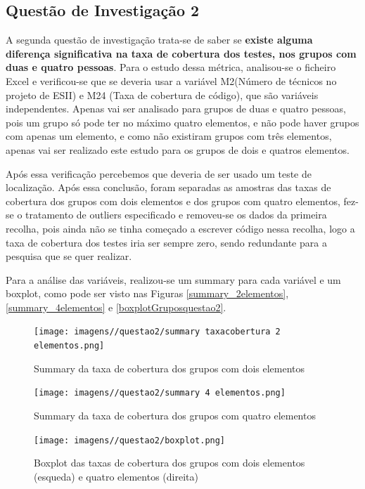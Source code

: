 \subsection{Questão de Investigação 2}
A segunda questão de investigação trata-se de saber se \textbf{existe alguma diferença significativa na taxa de cobertura dos testes, nos grupos com duas e quatro pessoas}. Para o estudo dessa métrica, analisou-se o ficheiro Excel e verificou-se que se deveria usar a variável M2(Número de técnicos no projeto de ESII) e M24 (Taxa de cobertura de código), que são variáveis independentes. Apenas vai ser analisado para grupos de duas e quatro pessoas, pois um grupo só pode ter no máximo quatro elementos, e não pode haver grupos com apenas um elemento, e como não existiram grupos com três elementos, apenas vai ser realizado este estudo para os grupos de dois e quatros elementos.

\vspace{0.2cm}


Após essa verificação percebemos que deveria de ser usado um teste de localização. Após essa conclusão, foram separadas as amostras das taxas de cobertura dos grupos com dois elementos e dos grupos com quatro elementos, fez-se o tratamento de outliers especificado e removeu-se os dados da primeira recolha, pois ainda não se tinha começado a escrever código nessa recolha, logo a taxa de cobertura dos testes iria ser sempre zero, sendo redundante para a pesquisa que se quer realizar. 


\vspace{0.2cm}
Para a análise das variáveis, realizou-se um summary para cada variável e um boxplot, como pode ser visto nas Figuras \ref{summary_2elementos}, \ref{summary_4elementos} e \ref{boxplotGruposquestao2}.


\begin{figure}
    \centering
    \caption{Summary da taxa de cobertura dos grupos com dois elementos}
    \texttt{[image: imagens//questao2/summary taxacobertura 2 elementos.png]}
    \label{fig:summary_2elementos}
\end{figure}

\begin{figure}
    \centering
    \texttt{[image: imagens//questao2/summary 4 elementos.png]}
    \caption{Summary da taxa de cobertura dos grupos com quatro elementos}
    \label{fig:summary_4elementos}
\end{figure}

\begin{figure}[!h]
    \centering
    \texttt{[image: imagens//questao2/boxplot.png]}
    \caption{Boxplot das taxas de cobertura dos grupos com dois elementos (esqueda) e quatro elementos (direita)}
    \label{fig:boxplotGruposquestao2}
\end{figure}

